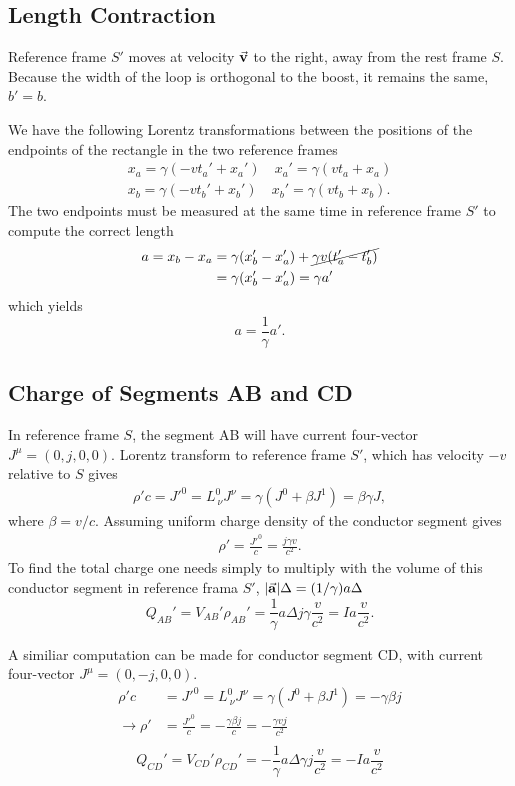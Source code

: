 \documentclass[11pt]{amsart}
\begin{document}
\subsection{Length Contraction}
Reference frame $S'$ moves at velocity $\va{v}$ to the right, away from the rest frame $S$. Because the width of the loop is orthogonal to the boost, it remains the same, $b' = b$. 

We have the following Lorentz transformations between the positions of the endpoints of the rectangle in the two reference frames
\begin{align*}
x_a = \gamma(-vt_a' + x_a') \quad x_a' = \gamma(vt_a + x_a) \\
x_b = \gamma(-vt_b' + x_b') \quad x_b' = \gamma(vt_b + x_b).
\end{align*}
The two endpoints must be measured at the same time in reference frame $S'$ to compute the correct length
\begin{align*}
a =x_b - x_a &= \gamma(x_b'- x_a') + \cancel{\gamma v(t_a' - t_b')} \\
			 &= \gamma(x_b'- x_a') = \gamma a'
\end{align*}
which yields
\begin{equation}
a = \frac{1}{\gamma}a'.
\end{equation}

\subsection{Charge of Segments AB and CD}
In reference frame $S$, the segment AB will have current four-vector $J^\mu = (0, j, 0, 0)$. Lorentz transform to reference frame $S'$, which has velocity $-v$ relative to $S$ gives
\begin{align*}
\rho'c = J'^0 = L^0_{\ \nu}J^\nu = \gamma(J^0 + \beta J^1) = \beta\gamma J,
\end{align*}
where $\beta = v/c$. Assuming uniform charge density of the conductor segment gives
\begin{align*}
\rho' = \frac{J'^0}{c} = \frac{j\gamma v}{c^2}.
\end{align*}
To find the total charge one needs simply to multiply with the volume of this conductor segment in reference frama $S'$, $\abs{\va{a}}\Delta = (1/\gamma)a\Delta$
\begin{equation}
Q_{AB}' = V_{AB}'\rho_{AB}' = \frac{1}{\gamma}a\Delta j\gamma \frac{v}{c^2} = I a\frac{v}{c^2}.
\end{equation}

A similiar computation can be made for conductor segment CD, with current four-vector $J^\mu = (0, -j, 0, 0)$.
\begin{align*}
\rho'c &= J'^0 = L^0_{\ \nu} J^\nu = \gamma(J^0+ \beta J^1) = -\gamma\beta j \\
\rightarrow \rho' &= \frac{J'^0}{c} = -\frac{\gamma\beta j}{c} = -\frac{\gamma v j}{c^2} \\
\end{align*}
\begin{equation}
Q_{CD}' = V_{CD}'\rho_{CD}' = -\frac{1}{\gamma}a\Delta \gamma j\frac{ v}{c^2} = -Ia\frac{v}{c^2}
\end{equation}
\end{document}
